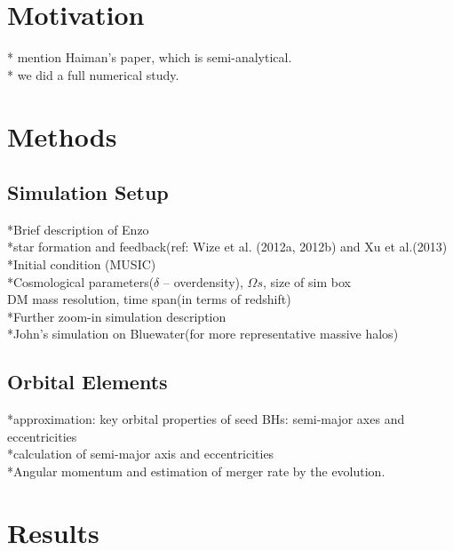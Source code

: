 \documentclass[useAMS,usenatbib]{mn2e}
\begin{document}
\section{Motivation}
* mention Haiman's paper, which is semi-analytical. \\
* we did a full numerical study. \\

\section{Methods}

\subsection{Simulation Setup}
*Brief description of Enzo \\
*star formation and feedback(ref: Wize et al. (2012a, 2012b) and Xu et
al.(2013)\\

*Initial condition (MUSIC)\\
*Cosmological parameters($\delta$ -- overdensity), $\Omega s$, size of sim box\\
DM mass resolution, time span(in terms of redshift)\\

*Further zoom-in simulation description\\
*John's simulation on Bluewater(for more representative massive halos)
\subsection{Orbital Elements}
*approximation: key orbital properties of seed BHs: semi-major axes and
eccentricities\\
*calculation of semi-major axis and eccentricities\\
*Angular momentum and estimation of merger rate by the evolution.\\

\section{Results}
\end{document}
